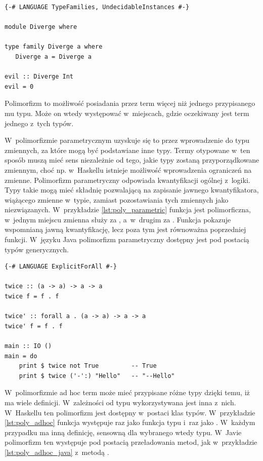 \begin{lstlisting}[float,label={lst:types_diverge},
                   caption={Przykład programu, dla którego statyczne sprawdzanie typów w GHC się nie zakończy.}]
{-# LANGUAGE TypeFamilies, UndecidableInstances #-}

module Diverge where

type family Diverge a where
   Diverge a = Diverge a

evil :: Diverge Int
evil = 0
\end{lstlisting}

Polimorfizm to możliwość posiadania przez term więcej niż jednego przypisanego
mu typu. Może on wtedy występować w~miejscach, gdzie oczekiwany jest term jednego
z~tych typów.

W~polimorfizmie parametrycznym uzyskuje się to przez wprowadzenie
do typu zmiennych, za które mogą być podstawiane inne typy. Termy otypowane w~ten
sposób muszą mieć sens niezależnie od tego, jakie typy zostaną przyporządkowane
zmiennym, choć np. w~Haskellu istnieje możliwość wprowadzenia ograniczeń na zmienne.
Polimorfizm parametryczny odpowiada kwantyfikacji ogólnej z~logiki. Typy takie
mogą mieć składnię pozwalającą na zapisanie jawnego kwantyfikatora, wiążącego
zmienne w~typie, zamiast pozostawiania tych zmiennych jako niezwiązanych.
W~przykładzie \ref{lst:poly_parametric} funkcja  jest polimorficzna,
w~jednym miejscu zmienna  służy za , a~w~drugim za .
Funkcja  pokazuje wspomnianą jawną kwantyfikację, lecz poza tym jest
równoważna poprzedniej funkcji. W~języku Java polimorfizm parametryczny
dostępny jest pod postacią typów generycznych.

\begin{lstlisting}[float,label={lst:poly_parametric},
                   caption={Przykład użycia polimorfizmu parametrycznego w Haskellu.}]
{-# LANGUAGE ExplicitForAll #-}

twice :: (a -> a) -> a -> a
twice f = f . f

twice' :: forall a . (a -> a) -> a -> a
twice' f = f . f

main :: IO ()
main = do
    print $ twice not True         -- True
    print $ twice ('-':) "Hello"   -- "--Hello"
\end{lstlisting}

W~polimorfizmie ad hoc term może mieć przypisane różne typy dzięki temu,
iż ma wiele definicji. W~zależności od typu wykorzystywana jest inna z~nich.
W~Haskellu ten polimorfizm jest dostępny w~postaci klas typów\cite{TAPL}.
W~przykładzie \ref{lst:poly_adhoc} funkcja  występuje raz jako
funkcja typu  i~raz jako . W~każdym
przypadku ma inną definicję, sensowną dla wybranego wtedy typu. W~Javie
polimorfizm ten występuje pod postacią przeładowania metod, jak w~przykładzie
\ref{lst:poly_adhoc_java} z~metodą .

